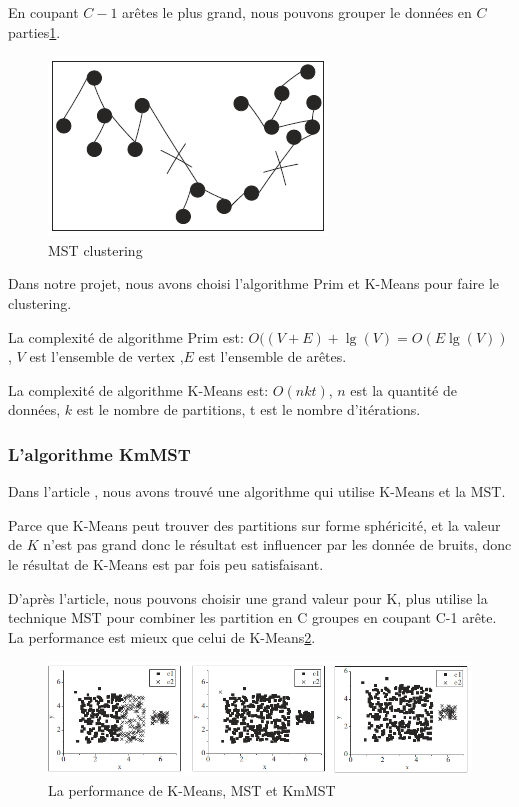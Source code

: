 En coupant $C-1$ arêtes le plus grand, nous pouvons grouper le données en $C$ parties\ref{fig:mstc}.
\begin{figure}[H]
\centering
\includegraphics[width=0.4\linewidth]{images/mstc}
\caption{MST clustering}
\label{fig:mstc}
\end{figure}

Dans notre projet, nous avons choisi l'algorithme Prim et K-Means pour faire le clustering. 

La complexité de algorithme Prim est: $O((V+E)+\lg (V) = O(E \lg (V)) $, $V$ est l'ensemble de vertex ,$E$ est l'ensemble de arêtes.

La complexité de algorithme K-Means est: $O(nkt)$, $n$ est la quantité de données, $k$ est le nombre de partitions, t est le nombre d'itérations.
\subsubsection{L'algorithme KmMST}

Dans l'article \cite{KmMst}, nous avons trouvé une algorithme qui utilise K-Means et la MST. 

Parce que K-Means peut trouver des partitions sur forme sphéricité, et la valeur de $K$ n'est pas grand donc le résultat est influencer par les donnée de bruits, donc le résultat de K-Means est par fois peu satisfaisant. 

D'après l'article, nous pouvons choisir une grand valeur pour K, plus utilise la technique MST pour combiner les partition en C groupes en coupant C-1 arête. La performance est mieux que celui de K-Means\ref{fig:kmmst}.
\begin{figure}[H]
\centering
\includegraphics[width=1.0\linewidth]{images/kmmst}
\caption{La performance de K-Means, MST et KmMST}
\label{fig:kmmst}
\end{figure}

